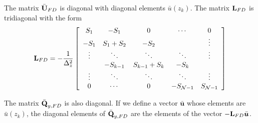 \documentclass[10pt]{article}
\newcommand{\sN}{\mathcal{N}}
\newcommand{\mat}[1]{\text{\bf #1}}
\begin{document}
The matrix $\bar{\mat{U}}_{FD}$ is diagonal with diagonal elements $\bar u(z_k)$.
The matrix $\mat{L}_{FD}$ is tridiagonal with the form
\[\mat{L}_{FD} = -\frac{1}{\Delta_z^2}\left[\begin{array}{ccccc}
S_1&-S_1&0&\cdots&0\\
-S_1&S_1+S_2&-S_2&&\vdots\\
\vdots&\ddots&\ddots&\ddots&\vdots\\
&-S_{k-1}&S_{k-1}+S_k&-S_k&\\
\vdots&\ddots&\ddots&\ddots&\vdots\\
0&\cdots&0&-S_{\sN-1}&S_{\sN-1}
\end{array}\right]\]

The matrix $\bar{\mat{Q}}_{y,FD}$ is also diagonal.
If we define a vector $\bar{\bm{u}}$ whose elements are $\bar u(z_k)$, the diagonal elements of $\bar{\mat{Q}}_{y,FD}$ are the elements of the vector $-\mat{L}_{FD}\bar{\bm{u}}$.
\end{document}
